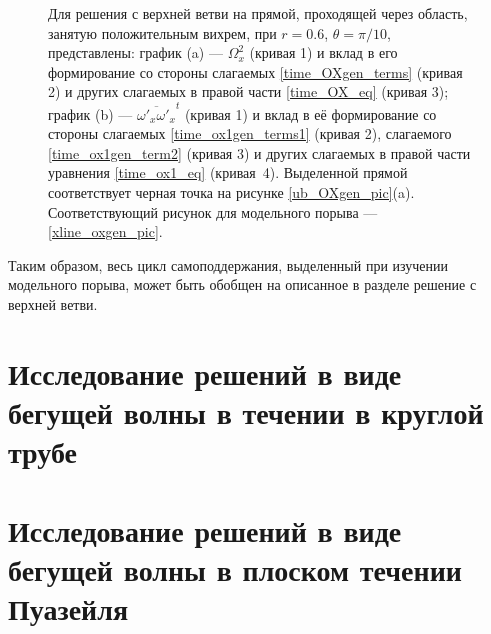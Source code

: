 \begin{figure}
\caption{Для решения с верхней ветви на прямой, проходящей через область, занятую положительным вихрем, при $r = 0.6$, $\theta = \pi/10$, представлены: график (a) --- $\Omega_x^2$ (кривая 1) и вклад в его формирование со стороны слагаемых \eqref{time_OXgen_terms} (кривая 2) и других слагаемых в правой части \eqref{time_OX_eq} (кривая 3); график (b) --- $\overline{\omega'_x\omega'_x}^t$ (кривая 1) и вклад в её формирование со стороны слагаемых \eqref{time_ox1gen_terms1} (кривая 2), слагаемого \eqref{time_ox1gen_term2} (кривая 3) и других слагаемых в правой части уравнения \eqref{time_ox1_eq} (кривая~4). Выделенной прямой соответствует черная точка на рисунке \ref{ub_OXgen_pic}(a). Соответствующий рисунок для модельного порыва --- \ref{xline_oxgen_pic}.} 
\label{ub_oxgen_lines_pic}
\end{figure}

Таким образом, весь цикл самоподдержания, выделенный при изучении модельного порыва, может быть обобщен на описанное в разделе решение с верхней ветви. 

\begin{comment}
\begin{figure}
\center{\texttt{[image: ub\_ox1gen\_map.png]}}
\caption{Для решения с верхней ветви в сечении, где амплитуда пульсаций достигает наибольшей величины, представлена величина $\overline{\omega'_x \omega'_x}^t$ (график a) и вклад в её формирование со стороны слагаемых \eqref{time_ox1gen_terms1} (график b),  слагаемых  \eqref{time_ox1gen_term2} (график с) и других слагаемых в правой части уравнения \eqref{time_ox1_eq} (график d). }
\label{ub_ox1gen_pic}
\end{figure}
\end{comment}

\section{Исследование решений в виде бегущей волны в течении в круглой трубе}

\section{Исследование решений в виде бегущей волны в плоском течении Пуазейля}

